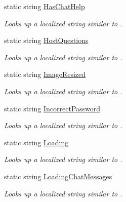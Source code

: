 \begin{DoxyCompactItemize}
static string \hyperlink{class_wis_r_1_1_app___resources_1_1_resource_a6097d990dc5d69b7561aed2481d16ef4}{Has\+Chat\+Help}
\begin{DoxyCompactList}\small\item\em Looks up a localized string similar to . \end{DoxyCompactList}\item 
static string \hyperlink{class_wis_r_1_1_app___resources_1_1_resource_aaf80c566ef59c3067497af0bee07327c}{Host\+Questions}
\begin{DoxyCompactList}\small\item\em Looks up a localized string similar to . \end{DoxyCompactList}\item 
static string \hyperlink{class_wis_r_1_1_app___resources_1_1_resource_afd0827425222d904f98c12babf07df00}{Image\+Resized}
\begin{DoxyCompactList}\small\item\em Looks up a localized string similar to . \end{DoxyCompactList}\item 
static string \hyperlink{class_wis_r_1_1_app___resources_1_1_resource_a7ab4008d259ac47d3f52d6df0449cbff}{Incorrect\+Password}
\begin{DoxyCompactList}\small\item\em Looks up a localized string similar to . \end{DoxyCompactList}\item 
static string \hyperlink{class_wis_r_1_1_app___resources_1_1_resource_a664d1523d23ba66b3f8f7c0851af0c41}{Loading}
\begin{DoxyCompactList}\small\item\em Looks up a localized string similar to . \end{DoxyCompactList}\item 
static string \hyperlink{class_wis_r_1_1_app___resources_1_1_resource_ab61fe79ace1ba6585c889519d807ac2a}{Loading\+Chat\+Messages}
\begin{DoxyCompactList}\small\item\em Looks up a localized string similar to . \end{DoxyCompactList}\item 

\end{DoxyCompactItemize}
